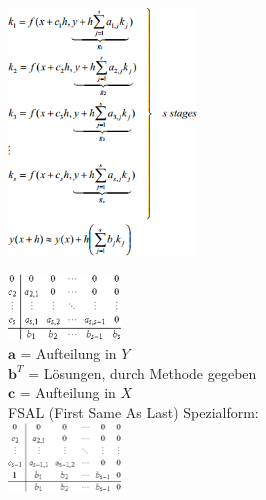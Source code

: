       \begin{minipage}{6cm}
        \includegraphics[width=5cm]{./bilder/ode_rungekutta_framework1.png}
      \end{minipage}
      \begin{minipage}{4.5cm}
        \includegraphics[width=3cm]{./bilder/ode_rungekutta_butcher.png}\\
        $\bm a$ = Aufteilung in $Y$\\
        $\bm b^T$ = Lösungen, durch Methode gegeben\\
        $\bm c$ = Aufteilung in $X$\\
        
        FSAL (First Same As Last) Spezialform:\\
        \includegraphics[width=3cm]{./bilder/butcher_fsal.png} 
      \end{minipage}
      \hspace{0.5cm}
